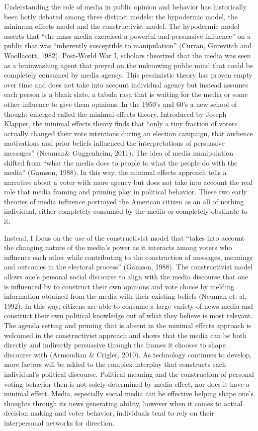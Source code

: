 \documentclass[11pt,]{article}
\begin{document}
Understanding the role of media in public opinion and behavior has
historically been hotly debated among three distinct models: the
hypodermic model, the minimum effects model and the constructivist
model. The hypodermic model asserts that ``the mass media exercised a
powerful and persuasive influence'' on a public that was ``inherently
susceptible to manipulation'' (Curran, Gurevitch and Woollacott, 1982).
Post-World War I, scholars theorized that the media was seen as a
brainwashing agent that preyed on the unknowing public mind that could
be completely consumed by media agency. This pessimistic theory has
proven empty over time and does not take into account individual agency
but instead assumes each person is a blank slate, a tabula rasa that is
waiting for the media or some other influence to give them opinions. In
the 1950's and 60's a new school of thought emerged called the minimal
effects theory. Introduced by Joseph Klapper, the minimal effects theory
finds that ``only a tiny fraction of voters actually changed their vote
intentions during an election campaign, that audience motivations and
prior beliefs influenced the interpretations of persuasive messages''
(Neuman\& Guggenheim, 2011). The idea of media manipulation shifted from
``what the media does to people to what the people do with the media''
(Gamson, 1988). In this way, the minimal effects approach tells a
narrative about a voter with more agency but does not take into account
the real role that media framing and priming play in political behavior.
These two early theories of media influence portrayed the American
citizen as an all of nothing individual, either completely consumed by
the media or completely obstinate to it.

Instead, I focus on the use of the constructivist model that ``takes
into account the changing nature of the media's power as it interacts
among voters who influence each other while contributing to the
construction of messages, meanings and outcomes in the electoral
process'' (Gamson, 1988). The constructivist model allows one's personal
social discourse to align with the media discourse that one is
influenced by to construct their own opinions and vote choice by melding
information obtained from the media with their existing beliefs (Neuman
et. al, 1992). In this way, citizens are able to consume a large variety
of news media and construct their own political knowledge out of what
they believe is most relevant. The agenda setting and priming that is
absent in the minimal effects approach is welcomed in the constructivist
approach and shows that the media can be both directly and indirectly
persuasive through the frames it chooses to shape discourse with
(Armoudian \& Crigler, 2010). As technology continues to develop, more
factors will be added to the complex interplay that constructs each
individual's political discourse. Political meaning and the construction
of personal voting behavior then is not solely determined by media
effect, nor does it have a minimal effect. Media, especially social
media can be effective helping shape one's thoughts through its news
generating ability, however when it comes to actual decision making and
voter behavior, individuals tend to rely on their interpersonal networks
for direction.
\end{document}
